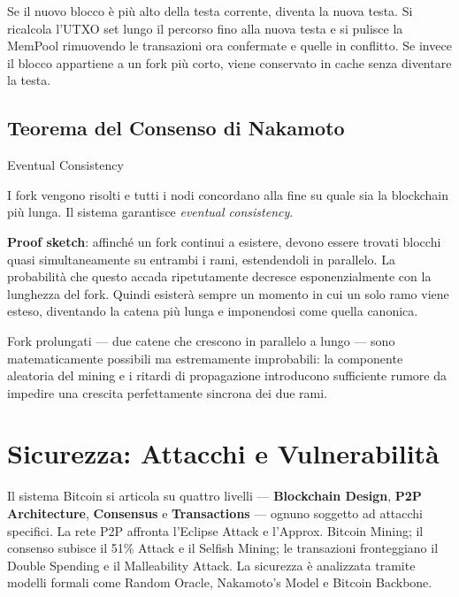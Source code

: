 \documentclass[
  italian,
  openany]{book}
\begin{document}
Se il nuovo blocco è più alto della testa corrente, diventa la nuova
testa. Si ricalcola l'UTXO set lungo il percorso fino alla nuova testa e
si pulisce la MemPool rimuovendo le transazioni ora confermate e quelle
in conflitto. Se invece il blocco appartiene a un fork più corto, viene
conservato in cache senza diventare la testa.

\subsection{Teorema del Consenso di
Nakamoto}\label{teorema-del-consenso-di-nakamoto}

\begin{callouttheorem}{Eventual Consistency}

I fork vengono risolti e tutti i nodi concordano alla fine su quale sia
la blockchain più lunga. Il sistema garantisce \emph{eventual
consistency}.

\textbf{Proof sketch}: affinché un fork continui a esistere, devono
essere trovati blocchi quasi simultaneamente su entrambi i rami,
estendendoli in parallelo. La probabilità che questo accada
ripetutamente decresce esponenzialmente con la lunghezza del fork.
Quindi esisterà sempre un momento in cui un solo ramo viene esteso,
diventando la catena più lunga e imponendosi come quella canonica.

\end{callouttheorem}

Fork prolungati --- due catene che crescono in parallelo a lungo ---
sono matematicamente possibili ma estremamente improbabili: la
componente aleatoria del mining e i ritardi di propagazione introducono
sufficiente rumore da impedire una crescita perfettamente sincrona dei
due rami.

\section{Sicurezza: Attacchi e
Vulnerabilità}\label{sicurezza-attacchi-e-vulnerabilituxe0}

Il sistema Bitcoin si articola su quattro livelli --- \textbf{Blockchain
Design}, \textbf{P2P Architecture}, \textbf{Consensus} e
\textbf{Transactions} --- ognuno soggetto ad attacchi specifici. La rete
P2P affronta l'Eclipse Attack e l'Approx. Bitcoin Mining; il consenso
subisce il 51\% Attack e il Selfish Mining; le transazioni fronteggiano
il Double Spending e il Malleability Attack. La sicurezza è analizzata
tramite modelli formali come Random Oracle, Nakamoto's Model e Bitcoin
Backbone.
\end{document}
